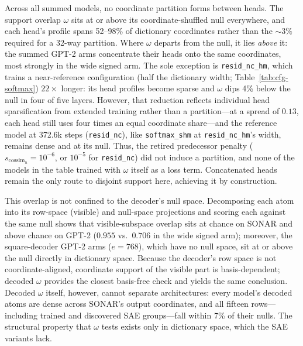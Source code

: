 Across all summed models, no coordinate partition forms between heads. The
support overlap $\omega$ sits at or above its coordinate-shuffled null
everywhere, and each head's profile spans 52--98\% of dictionary
coordinates rather than the ${\sim}3\%$ required for a 32-way partition.
Where $\omega$ departs from the null, it lies \emph{above} it: the summed
GPT-2 arms concentrate their heads onto the same coordinates, most
strongly in the wide signed arm. The sole exception is
\texttt{resid\_nc\_hm}, which trains a near-reference configuration (half
the dictionary width; Table~\ref{tab:cfg-softmax}) $22\times$
longer: its head profiles become sparse and $\omega$ dips 4\% below the
null in four of five layers. However, that reduction reflects individual
head sparsification from extended training rather than a partition---at a
spread of $0.13$, each head still uses four times an equal coordinate
share---and the reference model at 372.6k steps (\texttt{resid\_nc}),
like \texttt{softmax\_shm} at \texttt{resid\_nc\_hm}'s width, remains dense
and at its null. Thus, the retired predecessor penalty
($s_{\mathrm{cossim}_h}{=}10^{-6}$, or $10^{-5}$ for \texttt{resid\_nc})
did not induce a partition, and none of the models in the table trained
with $\omega$ itself as a loss term. Concatenated heads remain the only
route to disjoint support here, achieving it by construction.

This overlap is not confined to the decoder's null space. Decomposing each
atom into its row-space (visible) and null-space projections and scoring
each against the same null shows that visible-subspace overlap sits at
chance on SONAR and above chance on GPT-2 ($0.955$ vs.\ $0.706$ in the wide
signed arm); moreover, the square-decoder GPT-2 arms ($e{=}768$), which
have no null space, sit at or above the null directly in dictionary space.
Because the decoder's row space is not coordinate-aligned, coordinate
support of the visible part is basis-dependent; decoded $\omega$ provides
the closest basis-free check and yields the same conclusion. Decoded
$\omega$ itself, however, cannot separate architectures: every model's
decoded atoms are dense across SONAR's output coordinates, and all fifteen
rows---including trained and discovered SAE groups---fall within 7\% of
their nulls. The structural property that $\omega$ tests exists only in
dictionary space, which the SAE variants lack.

